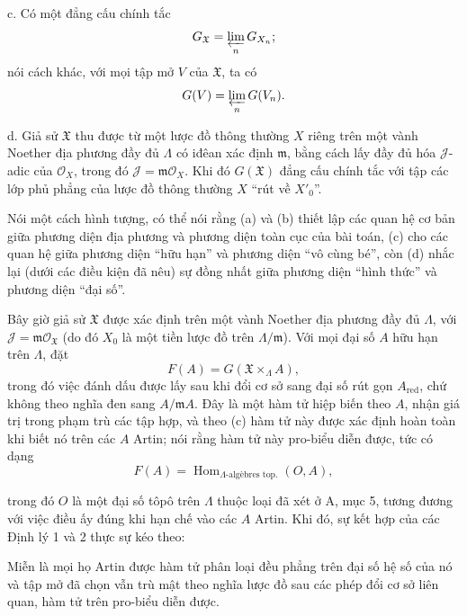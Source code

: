 \noindent c. Có một đẳng cấu chính tắc
\[
  G_{\mathfrak X}=\varprojlim_nG_{X_n} ;
\]
nói cách khác, với mọi tập mở $V$ của $\mathfrak X$, ta có
\[
  G(V)=\varprojlim_nG(V_n).
\]

\noindent d. Giả sử $\mathfrak X$ thu được từ một lược đồ thông thường $X$
riêng trên một vành Noether địa phương đầy đủ $\Lambda$ có iđêan xác định
$\mathfrak m$, bằng cách lấy đầy đủ hóa $\mathcal J$-adic của $\mathcal O_X$,
trong đó $\mathcal J=\mathfrak m\mathcal O_X$. Khi đó $G(\mathfrak X)$ đẳng
cấu chính tắc với tập các lớp phủ phẳng của lược đồ thông thường $X$ ``rút về
$X'_0$''.

Nói một cách hình tượng, có thể nói rằng (a) và (b) thiết lập các quan hệ cơ
bản giữa phương diện địa phương và phương diện toàn cục của bài toán, (c) cho
các quan hệ giữa phương diện ``hữu hạn'' và phương diện ``vô cùng bé'', còn
(d) nhắc lại (dưới các điều kiện đã nêu) sự đồng nhất giữa phương diện ``hình
thức'' và phương diện ``đại số''.

Bây giờ giả sử $\mathfrak X$ được xác định trên một vành Noether địa phương
đầy đủ $\Lambda$, với $\mathcal J=\mathfrak m\mathcal O_{\mathfrak X}$ (do đó
$X_0$ là một tiền lược đồ trên $\Lambda/\mathfrak m$). Với mọi đại số $A$ hữu
hạn trên $\Lambda$, đặt
\[
  F(A)=G(\mathfrak X\times_\Lambda A),
\]
trong đó việc đánh dấu được lấy sau khi đổi cơ sở sang đại số rút gọn
$A_{\mathrm{red}}$, chứ không theo nghĩa đen sang $A/\mathfrak mA$. Đây là một
hàm tử hiệp biến theo $A$, nhận giá trị trong phạm trù các tập hợp, và theo (c)
hàm tử này được xác định hoàn toàn khi biết nó trên các $A$ Artin; nói rằng
hàm tử này pro-biểu diễn được, tức có dạng
\[
  F(A)=\operatorname{Hom}_{\Lambda\text{-algèbres top.}}(O,A),
\]

trong đó $O$ là một đại số tôpô trên $\Lambda$ thuộc loại đã xét ở A, mục 5,
tương đương với việc điều ấy đúng khi hạn chế vào các $A$ Artin. Khi đó, sự kết
hợp của các Định lý 1 và 2 thực sự kéo theo:

 Miễn là mọi họ Artin được hàm tử phân loại đều phẳng trên
đại số hệ số của nó và tập mở đã chọn vẫn trù mật theo nghĩa lược đồ sau các
phép đổi cơ sở liên quan, hàm tử trên pro-biểu diễn được.

